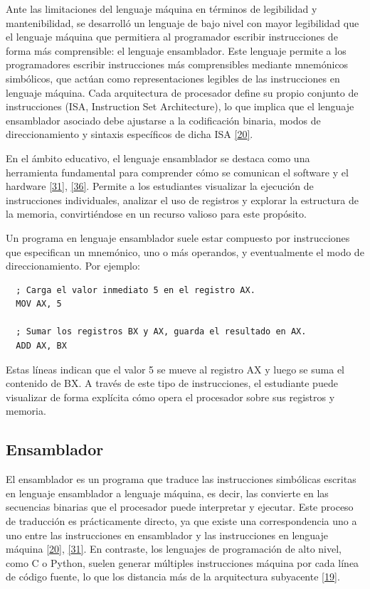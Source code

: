 \documentclass[12pt,oneside]{templates/unerthesis}
\begin{document}
Ante las limitaciones del lenguaje máquina en términos de legibilidad y mantenibilidad, se desarrolló un lenguaje de bajo nivel con mayor legibilidad que el lenguaje máquina que permitiera al programador escribir instrucciones de forma más comprensible: el lenguaje ensamblador. Este lenguaje permite a los programadores escribir instrucciones más comprensibles mediante mnemónicos simbólicos, que actúan como representaciones legibles de las instrucciones en lenguaje máquina. Cada arquitectura de procesador define su propio conjunto de instrucciones (ISA, Instruction Set Architecture), lo que implica que el lenguaje ensamblador asociado debe ajustarse a la codificación binaria, modos de direccionamiento y sintaxis específicos de dicha ISA \protect\hyperlink{ref-stallings_computer_2021}{{[}20{]}}.

En el ámbito educativo, el lenguaje ensamblador se destaca como una herramienta fundamental para comprender cómo se comunican el software y el hardware \protect\hyperlink{ref-tanenbaum_structured_2016}{{[}31{]}}, \protect\hyperlink{ref-null_essentials_2023}{{[}36{]}}. Permite a los estudiantes visualizar la ejecución de instrucciones individuales, analizar el uso de registros y explorar la estructura de la memoria, convirtiéndose en un recurso valioso para este propósito.

Un programa en lenguaje ensamblador suele estar compuesto por instrucciones que especifican un mnemónico, uno o más operandos, y eventualmente el modo de direccionamiento. Por ejemplo:

\begin{lstlisting}
  ; Carga el valor inmediato 5 en el registro AX.
  MOV AX, 5  

  ; Sumar los registros BX y AX, guarda el resultado en AX.
  ADD AX, BX 
  \end{lstlisting}

Estas líneas indican que el valor 5 se mueve al registro AX y luego se suma el contenido de BX. A través de este tipo de instrucciones, el estudiante puede visualizar de forma explícita cómo opera el procesador sobre sus registros y memoria.

\hypertarget{ensamblador}{%
\subsection{Ensamblador}\label{ensamblador}}

El ensamblador es un programa que traduce las instrucciones simbólicas escritas en lenguaje ensamblador a lenguaje máquina, es decir, las convierte en las secuencias binarias que el procesador puede interpretar y ejecutar. Este proceso de traducción es prácticamente directo, ya que existe una correspondencia uno a uno entre las instrucciones en ensamblador y las instrucciones en lenguaje máquina \protect\hyperlink{ref-stallings_computer_2021}{{[}20{]}}, \protect\hyperlink{ref-tanenbaum_structured_2016}{{[}31{]}}. En contraste, los lenguajes de programación de alto nivel, como C o Python, suelen generar múltiples instrucciones máquina por cada línea de código fuente, lo que los distancia más de la arquitectura subyacente \protect\hyperlink{ref-hennessy2017computer}{{[}19{]}}.
\end{document}
